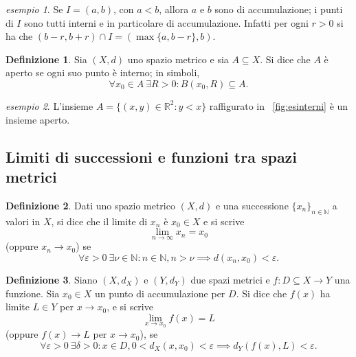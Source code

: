 \documentclass[a4paper]{book}
\numberwithin{equation}{section}
\theoremstyle{plain}
\theoremstyle{definition}
\newtheorem{defn}{Definizione}[section]
\theoremstyle{remark}
\theoremstyle{example}
\newtheorem{exmp}{esempio}[section]
\begin{document}
\begin{exmp}
	Se $I = (a, b)$, con $a<b$, allora $a$ e $b$ sono di accumulazione; i punti di $I$ sono tutti interni e in particolare di accumulazione. Infatti per ogni $r > 0$ si ha che $(b-r, b+r) \cap I = (\max \{ a, b-r \}, b)$.
\end{exmp}

\begin{defn}
	Sia $(X, d)$ uno spazio metrico e sia $A \subseteq X$. Si dice che $A$ è aperto se ogni suo punto è interno; in simboli,
	\begin{equation*}
		\forall x_0 \in A \ \exists R > 0\colon B(x_0, R) \subseteq A.
	\end{equation*}
\end{defn}

\begin{exmp}
	L'insieme $A = \{(x, y) \in \mathbb{R}^2 \colon y < x \}$ raffigurato in \figurename~\ref{fig:esinterni} è un insieme aperto.
\end{exmp}

\subsection{Limiti di successioni e funzioni tra spazi metrici}
\begin{defn}
	Dati uno spazio metrico $(X, d)$ e una successione $\{x_n\}_{n\in \mathbb{N}}$ a valori in $X$, si dice che il limite di $x_n$ è $x_0 \in X$ e si scrive
	\begin{equation*}
		\lim _{n\to \infty} x_n = x_0
	\end{equation*}
	(oppure $x_n \to x_0$) se
	\begin{equation*}
		\forall \varepsilon > 0 \ \exists \nu \in \mathbb{N}\colon n \in \mathbb{N}, n > \nu \implies d(x_n, x_0) < \varepsilon.
	\end{equation*}
\end{defn}

\begin{defn}
	Siano $(X, d_X)$ e $(Y, d_Y)$ due spazi metrici e $f\colon D\subseteq X \to Y$ una funzione. Sia $x_0 \in X$ un punto di accumulazione per $D$. Si dice che $f(x)$ ha limite $L \in Y$ per $x \to x_0$, e si scrive
	\begin{equation*}
		\lim_{x\to x_0} f(x) = L
	\end{equation*}
	(oppure $ f(x) \to L$ per $x \to x_0$), se
	\begin{equation*}
		\forall \varepsilon > 0 \ \exists \delta > 0 \colon x \in D, 0 < d_X(x, x_0) < \varepsilon \implies d_Y(f(x), L) < \varepsilon.
	\end{equation*}
\end{defn}
\end{document}
